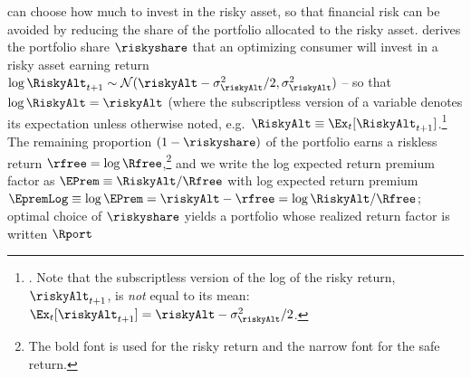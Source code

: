  can choose how much to invest in the risky asset, so that financial risk can be avoided by reducing the share of the portfolio allocated to the risky asset.   derives the portfolio share $\riskyshare$
  that an optimizing consumer will invest in a risky asset earning
  return $\log \RiskyAlt_{t+1} \sim \mathcal{N}(\riskyAlt -
  \sigma^{2}_{\riskyAlt}/2,\sigma^{2}_{\riskyAlt})$ -- so that $\log \RiskyAlt =
  \riskyAlt$ (where the subscriptless version of a variable denotes
  its expectation unless otherwise noted, e.g.\ $\RiskyAlt \equiv \Ex_{t}[\RiskyAlt_{t+1}]$.\footnote{. Note that the subscriptless version of the log of the risky return, $\riskyAlt_{t+1}$, is {\it not} equal to its mean: $\Ex_{t}[\riskyAlt_{t+1}] = \riskyAlt-\sigma^{2}_{\riskyAlt}/2$.}  The remaining proportion $(1-\riskyshare)$
  of the portfolio earns a riskless return $\rfree = \log \Rfree$,\footnote{The bold
    font is used for the risky return and the narrow font for the safe
    return.} and we write the log  expected return premium factor as
  $\EPrem \equiv \RiskyAlt/\Rfree$ with log expected return premium $\EpremLog
  \equiv \log \EPrem = \riskyAlt-\rfree = \log \RiskyAlt/\Rfree$;
  optimal choice of $\riskyshare$ yields a portfolio whose realized return factor is written
$\Rport$
